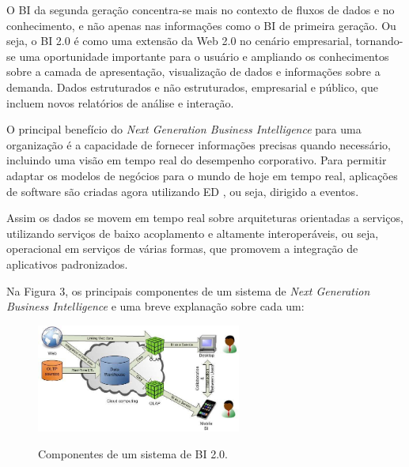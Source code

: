 O BI da segunda gera\c{c}\~{a}o concentra-se mais no contexto de fluxos de dados e no conhecimento, e n\~{a}o apenas nas informa\c{c}ões como o BI de primeira gera\c{c}\~{a}o. Ou seja, o BI 2.0 \'{e} como uma extens\~{a}o da Web 2.0 no cen\'{a}rio empresarial, tornando-se uma oportunidade importante para o usu\'{a}rio e ampliando os conhecimentos sobre a camada de apresenta\c{c}\~{a}o, visualiza\c{c}\~{a}o de dados e informa\c{c}ões sobre a demanda. Dados estruturados e n\~{a}o estruturados, empresarial e público, que incluem novos relatórios de an\'{a}lise e intera\c{c}\~{a}o.

O principal benefício do \textit{Next Generation Business Intelligence} para uma organiza\c{c}\~{a}o \'{e} a capacidade de fornecer informa\c{c}ões precisas quando necess\'{a}rio, incluindo uma vis\~{a}o em tempo real do desempenho corporativo. Para permitir adaptar os modelos de negócios para o mundo de hoje em tempo real, aplica\c{c}ões de software s\~{a}o criadas agora utilizando ED , ou seja, dirigido a eventos. 

Assim os dados se movem em tempo real sobre arquiteturas orientadas a servi\c{c}os, utilizando servi\c{c}os de baixo acoplamento e altamente interoper\'{a}veis, ou seja, operacional em servi\c{c}os de v\'{a}rias formas, que promovem a integra\c{c}\~{a}o de aplicativos padronizados.

Na Figura 3, os principais componentes de um sistema de \textit{Next Generation Business Intelligence} e uma breve explana\c{c}\~{a}o sobre cada um:

\begin{figure}[H]
	\vspace*{0,2cm}
    \centering
    \caption{Componentes de um sistema de BI 2.0.}
    \includegraphics[width=0.6\textwidth]{./04-figuras/figura-03}
    \label{fig:ilustfig03}
\end{figure}
\vspace*{-0,9cm}
{\raggedright {}}\\


